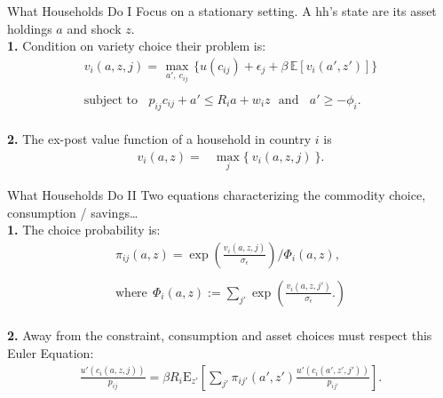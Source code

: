 \documentclass[9pt,pdftex,aspectratio=1610]{beamer}
\theoremstyle{definition}
\begin{document}

\begin{frame}[t]{What Households Do I}
\smallskip
Focus on a stationary setting. A hh's state are its asset holdings $a$ and shock $z$.\\
\bigskip
\textbf{1.} Condition on variety choice their problem is:
\begin{align}
v_{i}(a, z, j) =   \max_{\ a', \ c_{ij}  \ }\bigg  \{ u(c_{ij}) + \epsilon_{j}  + \beta \, \mathbb{E} [v_{i}(a', z')]  \bigg\} \nonumber \\
\nonumber \\
\mbox{subject to}  \ \ \  \  p_{ij}c_{ij} +  a' \leq    R_{i} a + w_{i} z \ \ \  \mbox{and} \ \ \ \ a' \geq - \phi_{i}. \nonumber
\end{align}\\
\bigskip
\medskip
\textbf{2.} The ex-post value function of a household in country $i$ is
\begin{align}
v_{i}(a, z) = &  \max_{j} \big  \{ \  v_{i}(a, z, j)  \ \big \}. \nonumber
\end{align}
\end{frame}


\begin{frame}[t]{What Households Do II}
\smallskip
Two equations characterizing the commodity choice, consumption / savings\ldots\\
\medskip
\textbf{1.} The choice probability is:
\begin{align*}
\pi_{ij}(a, z) = \exp \left( \frac{ v_{i}(a, z, j) }{\sigma_{\epsilon}} \right) \Bigg / \Phi_{i}(a,z) ,\\
\\
\mbox{where} \ \ \Phi_{i}(a,z) := \sum_{j'} \exp \left( \frac{ v_{i}(a, z, j') }{\sigma_{\epsilon}} . \right)
\end{align*}\\
\bigskip
\medskip
\textbf{2.} Away from the constraint, consumption and asset choices must respect this Euler Equation:
\begin{align*}
\frac{u'(c_{i}(a, z, j))}{p_{ij}} = \beta R_{i} \mathrm{E}_{z'} \left[ \sum_{j'} \pi_{ij'}(a', z') \frac{u'(c_{i}(a', z', j'))}{p_{ij'}} \right].
\end{align*}
\end{frame}
\end{document}
